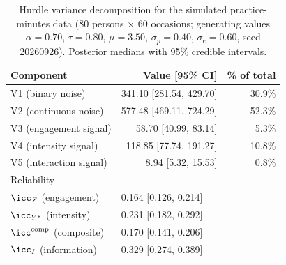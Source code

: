 \begin{table}[t]
\centering
\caption{Hurdle variance decomposition for the simulated practice-minutes data ($80$ persons $\times$ $60$ occasions; generating values $\alpha = 0.70$, $\tau = 0.80$, $\mu = 3.50$, $\sigma_p = 0.40$, $\sigma_e = 0.60$, seed 20260926). Posterior medians with 95\% credible intervals.}
\label{tab:hurdle}
\begin{tabular}{lrr}
\toprule
Component & Value [95\% CI] & \% of total \\
\midrule
V1 (binary noise) & 341.10 [281.54, 429.70] & 30.9\% \\
V2 (continuous noise) & 577.48 [469.11, 724.29] & 52.3\% \\
V3 (engagement signal) & 58.70 [40.99, 83.14] & 5.3\% \\
V4 (intensity signal) & 118.85 [77.74, 191.27] & 10.8\% \\
V5 (interaction signal) & 8.94 [5.32, 15.53] & 0.8\% \\
\midrule
\multicolumn{3}{l}{Reliability} \\
$\icc_Z$ (engagement) & \multicolumn{2}{l}{0.164 [0.126, 0.214]} \\
$\icc_{Y^*}$ (intensity) & \multicolumn{2}{l}{0.231 [0.182, 0.292]} \\
$\icc^{\mathrm{comp}}$ (composite) & \multicolumn{2}{l}{0.170 [0.141, 0.206]} \\
$\icc_I$ (information) & \multicolumn{2}{l}{0.329 [0.274, 0.389]} \\
\bottomrule
\end{tabular}
\end{table}
